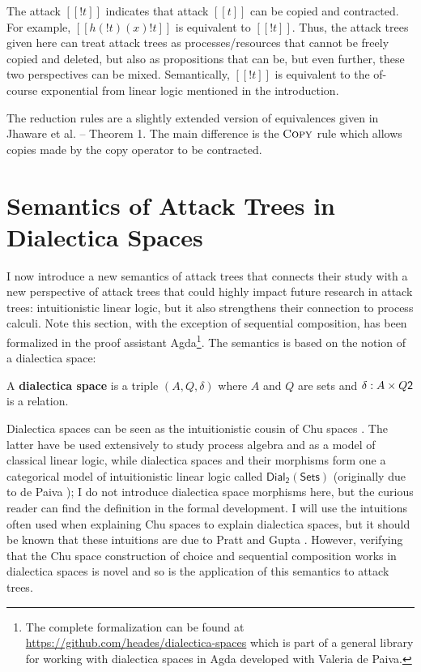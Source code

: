 \documentclass{llncs}
\let\to\relax
\newcommand{\to}{\rightarrow}
\newcommand{\dial}[0]{\mathsf{Dial_2}(\mathsf{Sets})}
\begin{document}
The attack $[[! t]]$ indicates that attack $[[t]]$ can be copied and
contracted.  For example, $[[h(!t) (x) !t]]$ is equivalent to $[[!
    t]]$.  Thus, the attack trees given here can treat attack trees as
processes/resources that cannot be freely copied and deleted, but also
as propositions that can be, but even further, these two perspectives
can be mixed.  Semantically, $[[! t]]$ is equivalent to the of-course
exponential from linear logic mentioned in the introduction.

The reduction rules are a slightly extended version of equivalences
given in Jhaware et al. \cite{Jhawar:2015} -- Theorem 1.  The main
difference is the $\textsc{Copy}$ rule which allows copies made by the
copy operator to be contracted.

\section{Semantics of Attack Trees in Dialectica Spaces}
\label{sec:concrete_semantics_of_attack_trees_in_dialectica_spaces}

I now introduce a new semantics of attack trees that connects their
study with a new perspective of attack trees that could highly impact
future research in attack trees: intuitionistic linear logic, but it
also strengthens their connection to process calculi.  Note this
section, with the exception of sequential composition, has been
formalized in the proof assistant Agda\footnote{The complete
  formalization can be found at
  \url{https://github.com/heades/dialectica-spaces} which is part of a
  general library for working with dialectica spaces in Agda developed
  with Valeria de Paiva.}.  The semantics is based on the notion of a
dialectica space:

\begin{definition}
  \label{def:dialectica-space}
  A \textbf{dialectica space} is a triple $(A, Q, \delta)$ where $A$
  and $Q$ are sets and $\delta : A \times Q \to \mathsf{2}$ is a
  relation.
\end{definition}

Dialectica spaces can be seen as the intuitionistic cousin
\cite{dePaiva:2006b} of Chu spaces \cite{Pratt:1999}.  The latter have
be used extensively to study process algebra and as a model of
classical linear logic, while dialectica spaces and their morphisms
form one a categorical model of intuitionistic linear logic called
$\dial$ (originally due to de Paiva \cite{dePaiva:1987}); I do not
introduce dialectica space morphisms here, but the curious reader can
find the definition in the formal development. I will use the
intuitions often used when explaining Chu spaces to explain dialectica
spaces, but it should be known that these intuitions are due to Pratt
and Gupta \cite{Gupta:1994}.  However, verifying that the Chu space
construction of choice and sequential composition works in dialectica
spaces is novel and so is the application of this semantics to attack
trees.
\end{document}
